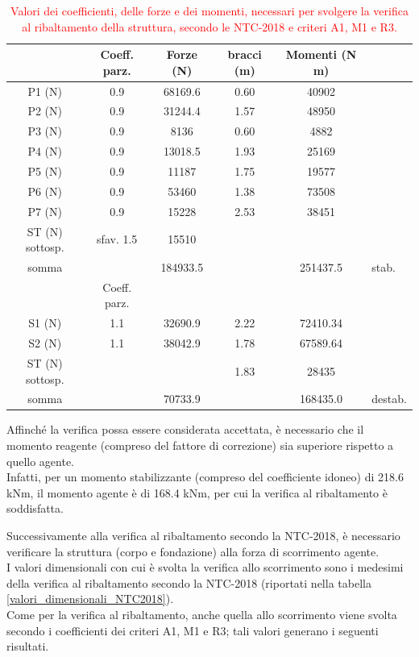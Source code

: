 \begin{table}[H] \centering
    \caption{\textcolor{red}{Valori dei coefficienti, delle forze e dei momenti, necessari per svolgere la verifica al ribaltamento della struttura, secondo le NTC-2018 e criteri A1, M1 e R3.}}
    \begin{tabular}{cccccl}
\toprule
& Coeff. parz. & Forze (N) & bracci (m) & Momenti (N m) &  \\
\midrule
P1 (N) & 0.9                & 68169.6   & 0.60       & 40902 &   \\
P2 (N) & 0.9    & 31244.4   & 1.57       & 48950            &         \\
P3 (N) & 0.9     & 8136      & 0.60       & 4882             &         \\
P4 (N) & 0.9     & 13018.5   & 1.93       & 25169            &         \\
P5 (N) & 0.9         & 11187     & 1.75       & 19577            & \\
P6 (N)       & 0.9   & 53460     & 1.38       & 73508        &         \\
P7 (N) & 0.9       & 15228     & 2.53       & 38451            & \\
ST (N) sottosp. & sfav.		1.5  & 15510     & &  & \\
somma                  &      & 184933.5  &  & 251437.5    & stab.   \\
\midrule
& Coeff. parz. &  &            &    &         \\
S1 (N)      & 1.1                & 32690.9   & 2.22   & 72410.34  & \\
S2 (N) & 1.1     & 38042.9  & 1.78       & 67589.64 &         \\
ST (N) sottosp.        &  &   & 1.83       & 28435            &         \\
somma  &      & 70733.9   &            & 168435.0         & destab. \\
\bottomrule
    \end{tabular}
    \end{table}
Affinché la verifica possa essere considerata accettata, è necessario che il momento reagente (compreso del fattore di correzione) sia superiore rispetto a quello agente.\\
Infatti, per un momento stabilizzante (compreso del coefficiente idoneo) di 218.6 kNm, il momento agente è di 168.4 kNm, per cui la verifica al ribaltamento è soddisfatta.

Successivamente alla verifica al ribaltamento secondo la NTC-2018, è necessario verificare la struttura (corpo e fondazione) alla forza di scorrimento agente.\\
I valori dimensionali con cui è svolta la verifica allo scorrimento sono i medesimi della verifica al ribaltamento secondo la NTC-2018 (riportati nella tabella \ref{valori_dimensionali_NTC2018}).\\
Come per la verifica al ribaltamento, anche quella allo scorrimento viene svolta secondo i coefficienti dei criteri A1, M1 e R3; tali valori generano i seguenti risultati.

